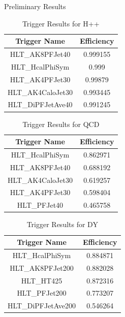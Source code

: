 \documentclass[final]{beamer}
\newlength{\colwidth}
\begin{document}
\begin{frame}[t]
\begin{columns}[t]
\begin{column}{\colwidth}
\begin{block}{Preliminary Results}
    \begin{table}[]
      \begin{center}
           \caption{\label{table:1}Trigger Results for H++}
     \begin{tabular}[t]{c|c}
          \hline
          \textbf{Trigger Name} & \textbf{Efficiency}\\
          \hline
          HLT\_AK8PFJet40 & 0.999155\\
          HLT\_HcalPhiSym & 0.999 \\
          HLT\_AK4PFJet30 & 0.99879 \\
          HLT\_AK4CaloJet30 & 0.993445 \\
          HLT\_DiPFJetAve40  & 0.991245
      \end{tabular}
    \end{center}
    \end{table}
    \begin{table}
      \caption{\label{table:2}Trigger Results for QCD}
          \begin{tabular}[t]{c|c}
              \hline
              \textbf{Trigger Name} & \textbf{Efficiency}\\
              \hline
              HLT\_HcalPhiSym & 0.862971\\
              HLT\_AK8PFJet40 & 0.688192 \\
              HLT\_AK4CaloJet30 & 0.619257 \\
              HLT\_AK4PFJet30 & 0.598404 \\
              HLT\_PFJet40 & 0.465758
          \end{tabular}
  \end{table}

  \begin{table}[h!]
    \caption{\label{table:3}Trigger Results for DY}
        \begin{tabular}[t]{c|c}
            \hline
            \textbf{Trigger Name} & \textbf{Efficiency}\\
            \hline
            HLT\_HcalPhiSym & 0.884871\\
            HLT\_AK8PFJet200 & 0.882028 \\
            HLT\_HT425 & 0.872316 \\
            HLT\_PFJet200 & 0.773207 \\
            HLT\_DiPFJetAve200 & 0.546264
        \end{tabular}
\end{table}
    


\end{block}
\end{column}
\end{columns}
\end{frame}
\end{document}

